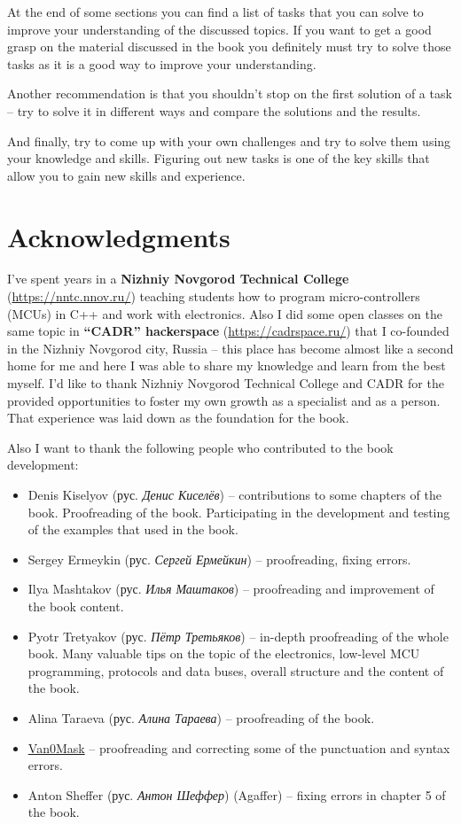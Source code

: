 \documentclass[../sparc.tex]{subfiles}
\begin{document}
At the end of some sections you can find a list of tasks that you can solve to
improve your understanding of the discussed topics.  If you want to get a good
grasp on the material discussed in the book you definitely must try to solve
those tasks as it is a good way to improve your understanding.

Another recommendation is that you shouldn't stop on the first solution of a
task -- try to solve it in different ways and compare the solutions and the
results.

And finally, try to come up with your own challenges and try to solve them using
your knowledge and skills.  Figuring out new tasks is one of the key skills that
allow you to gain new skills and experience.

\section*{Acknowledgments}

I've spent years in a \textbf{Nizhniy Novgorod Technical College}
(\url{https://nntc.nnov.ru/}) teaching students how to program micro-controllers
(MCUs) in C++ and work with electronics.  Also I did some open classes on the
same topic in \textbf{``CADR'' hackerspace} (\url{https://cadrspace.ru/}) that I
co-founded in the Nizhniy Novgorod city, Russia -- this place has become almost
like a second home for me and here I was able to share my knowledge and learn
from the best myself.  I'd like to thank Nizhniy Novgorod Technical College and
CADR for the provided opportunities to foster my own growth as a specialist and
as a person.  That experience was laid down as the foundation for the book.

Also I want to thank the following people who contributed to the book
development:
\begin{itemize}
\item Denis Kiselyov (рус. \emph{Денис Киселёв}) -- contributions to some
  chapters of the book.  Proofreading of the book.  Participating in the
  development and testing of the examples that used in the book.
\item Sergey Ermeykin (рус. \emph{Сергей Ермейкин}) -- proofreading, fixing
  errors.
\item Ilya Mashtakov (рус. \emph{Илья Маштаков}) – proofreading and improvement
  of the book content.
\item Pyotr Tretyakov (рус. \emph{Пётр Третьяков}) -- in-depth proofreading of
  the whole book.  Many valuable tips on the topic of the electronics, low-level
  MCU programming, protocols and data buses, overall structure and the content
  of the book.
\item Alina Taraeva (рус. \emph{Алина Тараева}) -- proofreading of the book.
\item \href{https://github.com/V4n0M4sk}{Van0Mask} -- proofreading and correcting some of the punctuation and syntax errors.
\item Anton Sheffer (рус. \emph{Антон Шеффер}) (Agaffer) -- fixing errors in
  chapter 5 of the book.
\end{itemize}
\end{document}
